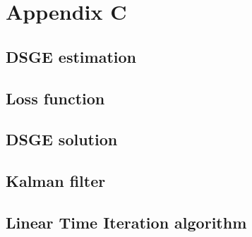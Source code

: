 \documentclass{pracamgr}
\numberwithin{equation}{section}
\begin{document}


\chapter*{Appendix C} \label{Appendix C}

\section*{DSGE estimation}



\newpage

\section*{Loss function}



\newpage

\section*{DSGE solution}



\newpage

\section*{Kalman filter}



\newpage

\section*{Linear Time Iteration algorithm}


\end{document}
